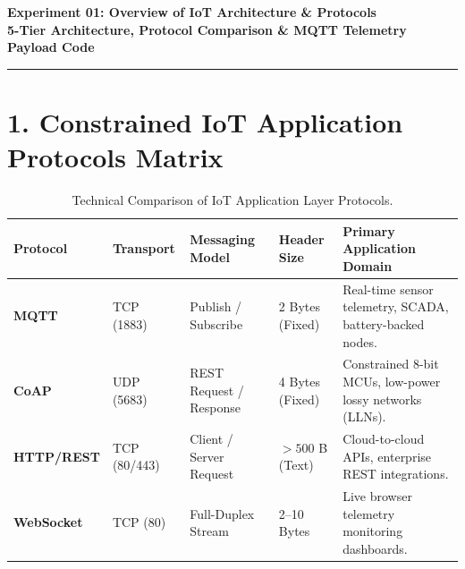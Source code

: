 \documentclass[10pt,a4paper]{article}
\begin{document}
\begin{center}
    {\large\bfseries Experiment 01: Overview of IoT Architecture \& Protocols}\\[0.06cm]
    {\normalsize\textbf{5-Tier Architecture, Protocol Comparison \& MQTT Telemetry Payload Code}}
\end{center}
\vspace{-0.24cm}
\rule{\textwidth}{0.8pt}
\vspace{0.06cm}

\section*{1. Constrained IoT Application Protocols Matrix}

\begin{table}[H]
\centering
\scriptsize
\setlength{\tabcolsep}{4.5pt}
\renewcommand{\arraystretch}{1.20}
\begin{tabularx}{\textwidth}{|p{1.8cm}|p{1.7cm}|p{3.2cm}|p{2.1cm}|X|}
\hline
\textbf{Protocol} & \textbf{Transport} & \textbf{Messaging Model} & \textbf{Header Size} & \textbf{Primary Application Domain} \\
\hline
\textbf{MQTT} & TCP (1883) & Publish / Subscribe & 2 Bytes (Fixed) & Real-time sensor telemetry, SCADA, battery-backed nodes. \\
\textbf{CoAP} & UDP (5683) & REST Request / Response & 4 Bytes (Fixed) & Constrained 8-bit MCUs, low-power lossy networks (LLNs). \\
\textbf{HTTP/REST} & TCP (80/443) & Client / Server Request & $>500$ B (Text) & Cloud-to-cloud APIs, enterprise REST integrations. \\
\textbf{WebSocket} & TCP (80) & Full-Duplex Stream & 2--10 Bytes & Live browser telemetry monitoring dashboards. \\
\hline
\end{tabularx}
\caption{Technical Comparison of IoT Application Layer Protocols.}
\end{table}

\vspace{-0.1cm}

\end{document}
